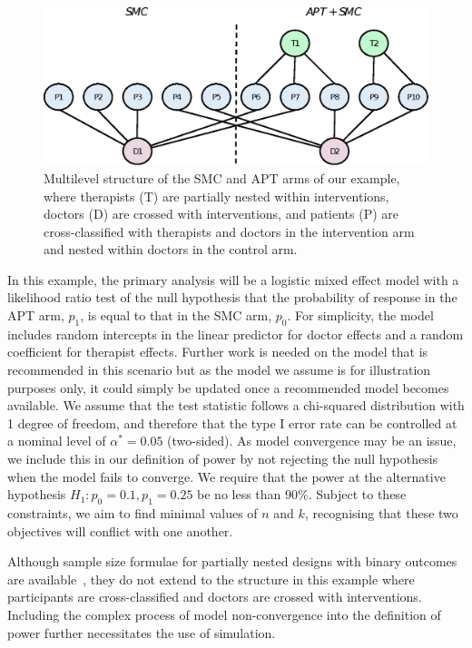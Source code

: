 \documentclass[sagev, doublespace, Crown]{sagej}
\begin{document}
\begin{figure}
\centering
\includegraphics[scale=0.7]{fig1_ex1_structure.eps}
\caption{Multilevel structure of the SMC and APT arms of our example, where therapists (T) are partially nested within interventions, doctors (D) are crossed with interventions, and patients (P) are cross-classified with therapists and doctors in the intervention arm and nested within doctors in the control arm.}
\label{fig:ex1_structure}
\end{figure}

In this example, the primary analysis will be a logistic mixed effect model with a likelihood ratio test of the null hypothesis that the probability of response in the APT arm, $p_1$, is equal to that in the SMC arm, $p_0$. For simplicity, the model includes random intercepts in the linear predictor for doctor effects and a random coefficient for therapist effects. Further work is needed on the model that is recommended in this scenario but as the model we assume is for illustration purposes only, it could simply be updated once a recommended model becomes available. We assume that the test statistic follows a chi-squared distribution with 1 degree of freedom, and therefore that the type I error rate can be controlled at a nominal level of $\alpha^* = 0.05$ (two-sided). As model convergence may be an issue, we include this in our definition of power by not rejecting the null hypothesis when the model fails to converge. We require that the power at the alternative hypothesis $H_1: p_0=0.1, p_1=0.25$ be no less than 90\%. Subject to these constraints, we aim to find minimal values of $n$ and $k$, recognising that these two objectives will conflict with one another. 

Although sample size formulae for partially nested designs with binary outcomes are available~\cite{Roberts2015}, they do not extend to the structure in this example where participants are cross-classified and doctors are crossed with interventions. Including the complex process of model non-convergence into the definition of power further necessitates the use of simulation.
\end{document}
